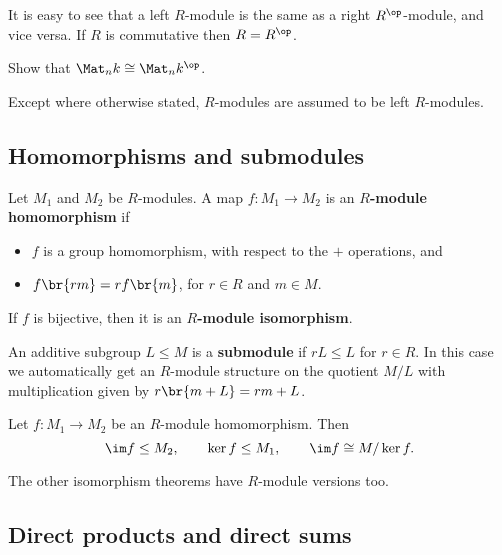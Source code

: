 It is easy to see that a left $ R $-module is the same as a right $ R^{\op} $-module, and vice versa. If $ R $ is commutative then $ R = R^{\op} $.

\begin{exercise*}
Show that $ \Mat_n k \cong \Mat_n k^{\op} $.
\end{exercise*}

Except where otherwise stated, $ R $-modules are assumed to be left $ R $-modules.

\pagebreak

\subsection{Homomorphisms and submodules}

\begin{definition}
Let $ M_1 $ and $ M_2 $ be $ R $-modules. A map $ f : M_1 \to M_2 $ is an \textbf{$ R $-module homomorphism} if
\begin{itemize}
\item $ f $ is a group homomorphism, with respect to the $ + $ operations, and
\item $ f\br{rm} = rf\br{m} $, for $ r \in R $ and $ m \in M $.
\end{itemize}
If $ f $ is bijective, then it is an \textbf{$ R $-module isomorphism}.
\end{definition}

\begin{definition}
An additive subgroup $ L \le M $ is a \textbf{submodule} if $ rL \le L $ for $ r \in R $. In this case we automatically get an $ R $-module structure on the quotient $ M / L $ with multiplication given by $ r\br{m + L} = rm + L $.
\end{definition}

\begin{theorem}
Let $ f : M_1 \to M_2 $ be an $ R $-module homomorphism. Then
$$ \im f \le M_2, \qquad \ker f \le M_1, \qquad \im f \cong M / \ker f. $$
\end{theorem}

The other isomorphism theorems have $ R $-module versions too.

\subsection{Direct products and direct sums}


